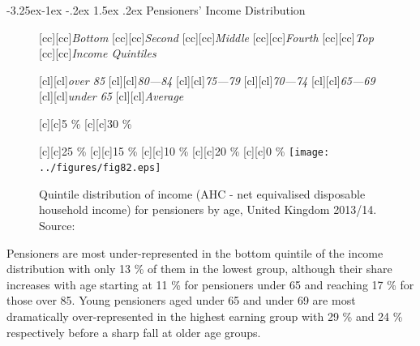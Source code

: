 \documentclass[11 pt, a4paper]{report}
\makeatletter
\renewcommand\subsection{\@startsection{subsection}{2}{\z@}%
                                     {-3.25ex\@plus -1ex \@minus -.2ex}%
                                     {1.5ex \@plus .2ex}%
    								{\large\scshape}}
\makeatother
\begin{document}
\subsection{Pensioners' Income Distribution}
\begin{figure}[hbtp!]

[cc][cc]{\small{\emph{Bottom}}}
[cc][cc]{\small{\emph{Second}}}
[cc][cc]{\small{\emph{Middle}}}
[cc][cc]{\small{\emph{Fourth}}}
[cc][cc]{\small{\emph{Top}}}
[cc][cc]{\small{\emph{Income Quintiles}}}


[cl][cl]{\small{\emph{over 85}}}
[cl][cl]{\small{\emph{80---84}}}
[cl][cl]{\small{\emph{75---79}}}
[cl][cl]{\small{\emph{70---74}}}
[cl][cl]{\small{\emph{65---69}}}
[cl][cl]{\small{\emph{under 65}}}
[cl][cl]{\small{\emph{Average}}}


[c][c]{\small{5 \%}}
[c][c]{\small{30 \%}}

[c][c]{\small{25 \%}}
[c][c]{\small{15 \%}}
[c][c]{\small{10 \%}}
[c][c]{\small{20 \%}}
[c][c]{\small{0 \%}}
\texttt{[image: ../figures/fig82.eps]}
\caption{Quintile distribution of income (AHC - net equivalised disposable household income) for pensioners by age, United Kingdom 2013/14. Source: \citet{DWP2015b}}\label{Fig:82} %
\end{figure}

Pensioners are most under-represented in the bottom quintile of the income distribution with only 13 \% of them in the lowest group, although their share increases with age starting at 11 \% for pensioners under 65 and reaching 17 \% for those over 85. Young pensioners aged under 65 and under 69 are most dramatically over-represented in the highest earning group with 29 \% and 24 \% respectively before a sharp fall at older age groups. 
\end{document}
